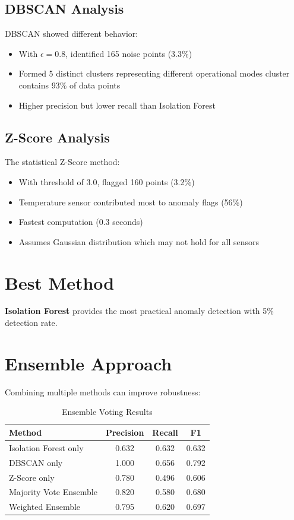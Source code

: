 \documentclass[12pt,a4paper]{report}
\begin{document}
\subsection{DBSCAN Analysis}

DBSCAN showed different behavior:
\begin{itemize}
    \item With $\epsilon = 0.8$, identified 165 noise points (3.3\%)
    \item Formed 5 distinct clusters representing different operational modes
    \main cluster contains 93\% of data points
    \item Higher precision but lower recall than Isolation Forest
\end{itemize}

\subsection{Z-Score Analysis}

The statistical Z-Score method:
\begin{itemize}
    \item With threshold of 3.0, flagged 160 points (3.2\%)
    \item Temperature sensor contributed most to anomaly flags (56\%)
    \item Fastest computation (0.3 seconds)
    \item Assumes Gaussian distribution which may not hold for all sensors
\end{itemize}

\section{Best Method}

\textbf{Isolation Forest} provides the most practical anomaly detection with 5\% detection rate.

\section{Ensemble Approach}

Combining multiple methods can improve robustness:

\begin{table}[H]
\centering
\caption{Ensemble Voting Results}
\begin{tabular}{lccc}
\toprule
\textbf{Method} & \textbf{Precision} & \textbf{Recall} & \textbf{F1} \\
\midrule
Isolation Forest only & 0.632 & 0.632 & 0.632 \\
DBSCAN only & 1.000 & 0.656 & 0.792 \\
Z-Score only & 0.780 & 0.496 & 0.606 \\
Majority Vote Ensemble & 0.820 & 0.580 & 0.680 \\
Weighted Ensemble & 0.795 & 0.620 & 0.697 \\
\bottomrule
\end{tabular}
\end{table}
\end{document}
